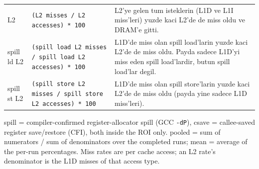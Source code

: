 \documentclass[10pt,a4paper,landscape]{article}
\begin{document}
{\begin{longtable}{lp{11cm}p{10cm}}
L2 & \texttt{(L2 misses / L2 accesses) * 100} & L2'ye gelen tum isteklerin (L1D ve L1I miss'leri) yuzde kaci L2'de de miss oldu ve DRAM'e gitti. \\
spill ld L2 & \texttt{(spill load L2 misses / spill load L2 accesses) * 100} & L1D'de miss olan spill load'larin yuzde kaci L2'de de miss oldu. Payda sadece L1D'yi miss eden spill load'lardir, butun spill load'lar degil. \\
spill st L2 & \texttt{(spill store L2 misses / spill store L2 accesses) * 100} & L1D'de miss olan spill store'larin yuzde kaci L2'de de miss oldu (payda yine sadece L1D miss'leri). \\
\end{longtable}
spill = compiler-confirmed register-allocator spill (GCC \texttt{-dP}), csave = callee-saved register save/restore (CFI), both inside the ROI only. pooled = sum of numerators / sum of denominators over the completed runs; mean = average of the per-run percentages. Miss rates are per cache access; an L2 rate's denominator is the L1D misses of that access type.\par}
\end{document}
